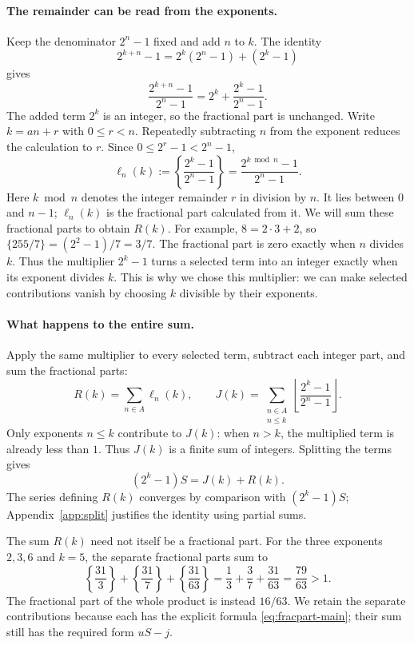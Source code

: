 \documentclass[10pt]{article}
\theoremstyle{plain}
\theoremstyle{definition}
\theoremstyle{remark}
\newcommand{\lft}{\ell}
\begin{document}
\paragraph{The remainder can be read from the exponents.}
Keep the denominator $2^n-1$ fixed and add $n$ to $k$. The identity
\[
 2^{k+n}-1=2^k(2^n-1)+(2^k-1)
\]
gives
\[
 \frac{2^{k+n}-1}{2^n-1}=2^k+\frac{2^k-1}{2^n-1}.
\]
The added term $2^k$ is an integer, so the fractional part is unchanged.
Write $k=an+r$ with $0\le r<n$. Repeatedly subtracting $n$ from the exponent
reduces the calculation to $r$. Since $0\le2^r-1<2^n-1$,
\begin{equation}\label{eq:fracpart-main}
 \lft_n(k):=\left\{\frac{2^k-1}{2^n-1}\right\}
 =\frac{2^{k\bmod n}-1}{2^n-1}.
\end{equation}
Here $k\bmod n$ denotes the integer remainder $r$ in division by $n$.
It lies between $0$ and $n-1$; $\lft_n(k)$ is the fractional part calculated
from it. We will sum these fractional parts to obtain $R(k)$.
For example, $8=2\cdot3+2$, so $\{255/7\}=(2^2-1)/7=3/7$.
The fractional part is zero exactly when $n$ divides $k$. Thus the
multiplier $2^k-1$ turns a selected term into an integer exactly when its
exponent divides $k$. This is why we chose this multiplier: we can make
selected contributions vanish by choosing $k$ divisible by their exponents.

\pagebreak[0]
\begin{samepage}
\paragraph{What happens to the entire sum.}
Apply the same multiplier to every selected term,
subtract each integer part, and sum the fractional parts:
\[
 R(k)=\sum_{n\in A}\lft_n(k),\qquad
 J(k)=\sum_{\substack{n\in A\\ n\le k}}
       \left\lfloor\frac{2^k-1}{2^n-1}\right\rfloor.
\]
Only exponents $n\le k$ contribute to $J(k)$: when $n>k$, the multiplied
term is already less than $1$. Thus $J(k)$ is a finite sum of integers.
Splitting the terms gives
\begin{equation}\label{eq:split-main}
 (2^k-1)S=J(k)+R(k).
\end{equation}
The series defining $R(k)$ converges by comparison with $(2^k-1)S$;
Appendix~\ref{app:split} justifies the identity using partial sums.\par
\end{samepage}

The sum $R(k)$ need not itself be a fractional part. For the three exponents
$2,3,6$ and $k=5$, the separate fractional parts sum to
\[
 \left\{\frac{31}3\right\}+\left\{\frac{31}7\right\}
 +\left\{\frac{31}{63}\right\}
 =\frac13+\frac37+\frac{31}{63}=\frac{79}{63}>1.
\]
The fractional part of the whole product is instead $16/63$.
We retain the separate contributions because each has the explicit formula
\eqref{eq:fracpart-main}; their sum still has the required form $uS-j$.
\end{document}
